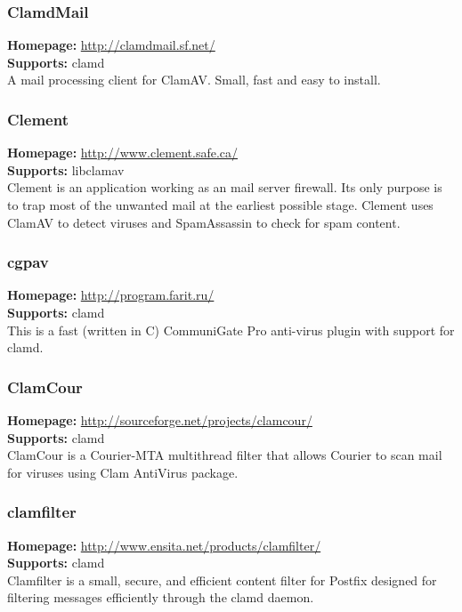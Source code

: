 \documentclass[a4paper,titlepage,12pt]{article}
\begin{document}
    \subsubsection{ClamdMail}
    \textbf{Homepage:} \url{http://clamdmail.sf.net/}\\
    \textbf{Supports:} clamd\\[4pt]
    A mail processing client for ClamAV. Small, fast and easy to install.

    \subsubsection{Clement}
    \textbf{Homepage:} \url{http://www.clement.safe.ca/}\\
    \textbf{Supports:} libclamav\\[4pt]
    Clement is an application working as an mail server firewall. Its only
    purpose is to trap most of the unwanted mail at the earliest possible stage.
    Clement uses ClamAV to detect viruses and SpamAssassin to check for spam
    content.

    \subsubsection{cgpav}
    \textbf{Homepage:} \url{http://program.farit.ru/}\\
    \textbf{Supports:} clamd\\[4pt]
    This is a fast (written in C) CommuniGate Pro anti-virus plugin with
    support for clamd.

    \subsubsection{ClamCour}
    \textbf{Homepage:} \url{http://sourceforge.net/projects/clamcour/}\\
    \textbf{Supports:} clamd\\[4pt]
    ClamCour is a Courier-MTA multithread filter that allows Courier to scan
    mail for viruses using Clam AntiVirus package.

    \subsubsection{clamfilter}
    \textbf{Homepage:} \url{http://www.ensita.net/products/clamfilter/}\\
    \textbf{Supports:} clamd\\[4pt]
    Clamfilter is a small, secure, and efficient content filter for Postfix
    designed for filtering messages efficiently through the clamd daemon.
\end{document}
